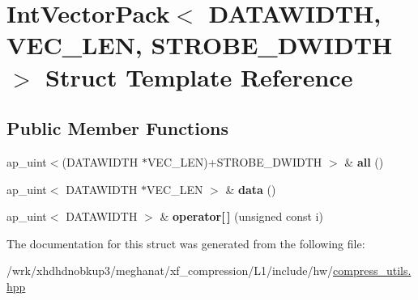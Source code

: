 \hypertarget{structIntVectorPack}{\section{Int\-Vector\-Pack$<$ D\-A\-T\-A\-W\-I\-D\-T\-H, V\-E\-C\-\_\-\-L\-E\-N, S\-T\-R\-O\-B\-E\-\_\-\-D\-W\-I\-D\-T\-H $>$ Struct Template Reference}
\label{structIntVectorPack}
}
\subsection*{Public Member Functions}
\begin{DoxyCompactItemize}
\item 
\hypertarget{structIntVectorPack_a923b26f3622f0ddb7bae2db1d666ca92}{ap\-\_\-uint$<$(D\-A\-T\-A\-W\-I\-D\-T\-H $\ast$V\-E\-C\-\_\-\-L\-E\-N)+S\-T\-R\-O\-B\-E\-\_\-\-D\-W\-I\-D\-T\-H $>$ \& {\bfseries all} ()}\label{structIntVectorPack_a923b26f3622f0ddb7bae2db1d666ca92}

\item 
\hypertarget{structIntVectorPack_ac5540c06957195f35751569ecd8a35b9}{ap\-\_\-uint$<$ D\-A\-T\-A\-W\-I\-D\-T\-H $\ast$V\-E\-C\-\_\-\-L\-E\-N $>$ \& {\bfseries data} ()}\label{structIntVectorPack_ac5540c06957195f35751569ecd8a35b9}

\item 
\hypertarget{structIntVectorPack_ab09a8720b5b20bacea13a218237fc2d6}{ap\-\_\-uint$<$ D\-A\-T\-A\-W\-I\-D\-T\-H $>$ \& {\bfseries operator\mbox{[}$\,$\mbox{]}} (unsigned const i)}\label{structIntVectorPack_ab09a8720b5b20bacea13a218237fc2d6}

\end{DoxyCompactItemize}


The documentation for this struct was generated from the following file\-:\begin{DoxyCompactItemize}
\item 
/wrk/xhdhdnobkup3/meghanat/xf\-\_\-compression/\-L1/include/hw/\hyperlink{compress__utils_8hpp}{compress\-\_\-utils.\-hpp}\end{DoxyCompactItemize}
